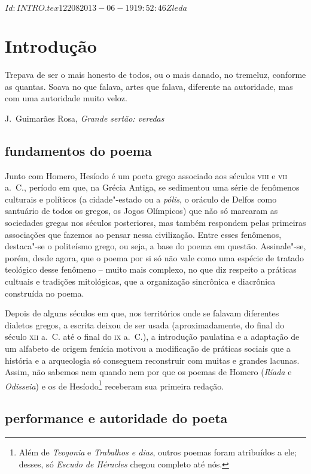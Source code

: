 \SVN $Id: INTRO.tex 12208 2013-06-19 19:52:46Z leda $ 

\chapter[Introdução, por Christian Werner]{Introdução}

\epigraph{Trepava de ser o mais honesto de todos, ou o mais danado, no
tremeluz, conforme as quantas. Soava no que falava, artes que falava, diferente
na autoridade, mas com uma autoridade muito veloz.}{J.~Guimarães Rosa,
\textit{Grande sertão: veredas}}


\section{fundamentos do poema}

Junto com Homero, Hesíodo é um poeta grego associado aos séculos
\textsc{viii} e \textsc{vii} a.~C., período em que, na Grécia Antiga, se sedimentou
uma série de fenômenos culturais e políticos (a cidade"-estado ou a \textit{pólis}, 
o oráculo de Delfos como santuário de
todos os gregos, os Jogos Olímpicos) que não só marcaram as sociedades
gregas nos séculos posteriores, mas também respondem pelas primeiras
associações que fazemos ao pensar nessa civilização. Entre esses fenômenos,
destaca"-se o politeísmo grego, ou seja, a base do poema em questão.
Assinale"-se, porém, desde agora, que o poema por si só não vale como uma
espécie de tratado teológico desse fenômeno – muito mais complexo, no que diz
respeito a práticas cultuais e tradições mitológicas, que a organização
sincrônica e diacrônica construída no poema.

Depois de alguns séculos em que, nos territórios onde se falavam diferentes
dialetos gregos, a escrita deixou de ser usada (aproximadamente, do final do
século \textsc{xii} a.~C. até o final do \textsc{ix} a.~C.), a introdução
paulatina e a adaptação de um alfabeto de origem fenícia motivou
a modificação de práticas sociais que a história e a arqueologia só
conseguem reconstruir com muitas e grandes lacunas. Assim, não sabemos nem
quando nem por que os poemas de Homero (\textit{Ilíada} e \textit{Odisseia}) e
os de Hesíodo\footnote{ Além de \textit{Teogonia} e \textit{Trabalhos e dias}, outros
poemas foram atribuídos a ele; desses, só \textit{Escudo de Héracles} chegou
completo até nós.} receberam sua primeira redação.

\section{performance e autoridade do poeta}

